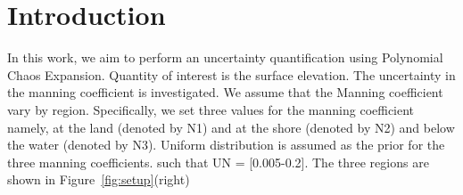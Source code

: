 
\section{Introduction} 

In this work, we aim to perform an uncertainty quantification
using Polynomial Chaos Expansion. Quantity of interest is the surface elevation.
The uncertainty in the manning coefficient is investigated.
We assume that the Manning coefficient vary by region. Specifically,
we set three values for the manning coefficient namely, at the land (denoted by N1)
and at the shore (denoted by N2) and below the water (denoted by N3).
Uniform distribution is assumed as the prior for the three manning coefficients.
such that UN = [0.005-0.2]. The three regions are shown in Figure~\ref{fig:setup}(right)
